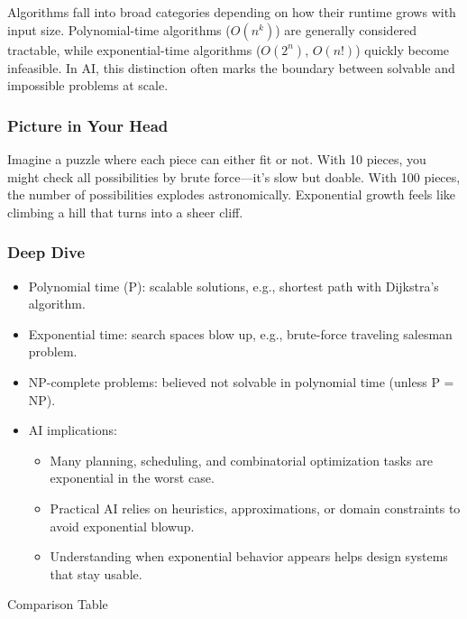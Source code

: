 \documentclass[
  letterpaper,
  DIV=11,
  numbers=noendperiod]{scrreprt}
\providecommand{\tightlist}{%
  \setlength{\itemsep}{0pt}\setlength{\parskip}{0pt}}
\begin{document}
Algorithms fall into broad categories depending on how their runtime
grows with input size. Polynomial-time algorithms (\(O(n^k)\)) are
generally considered tractable, while exponential-time algorithms
(\(O(2^n)\), \(O(n!)\)) quickly become infeasible. In AI, this
distinction often marks the boundary between solvable and impossible
problems at scale.

\subsubsection{Picture in Your Head}\label{picture-in-your-head-33}

Imagine a puzzle where each piece can either fit or not. With 10 pieces,
you might check all possibilities by brute force---it's slow but doable.
With 100 pieces, the number of possibilities explodes astronomically.
Exponential growth feels like climbing a hill that turns into a sheer
cliff.

\subsubsection{Deep Dive}\label{deep-dive-33}

\begin{itemize}
\item
  Polynomial time (P): scalable solutions, e.g., shortest path with
  Dijkstra's algorithm.
\item
  Exponential time: search spaces blow up, e.g., brute-force traveling
  salesman problem.
\item
  NP-complete problems: believed not solvable in polynomial time (unless
  P = NP).
\item
  AI implications:

  \begin{itemize}
  \tightlist
  \item
    Many planning, scheduling, and combinatorial optimization tasks are
    exponential in the worst case.
  \item
    Practical AI relies on heuristics, approximations, or domain
    constraints to avoid exponential blowup.
  \item
    Understanding when exponential behavior appears helps design systems
    that stay usable.
  \end{itemize}
\end{itemize}

Comparison Table
\end{document}
